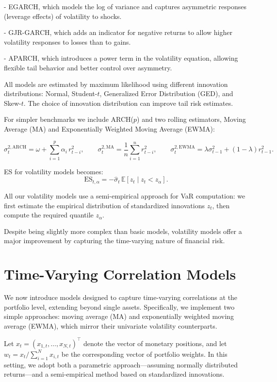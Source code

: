 \documentclass[12pt]{article}
\begin{document}
- EGARCH, which models the log of variance and captures asymmetric responses (leverage effects) of volatility to shocks.

- GJR-GARCH, which adds an indicator for negative returns to allow higher volatility responses to losses than to gains.

- APARCH, which introduces a power term in the volatility equation, allowing flexible tail behavior and better control over asymmetry.

All models are estimated by maximum likelihood using different innovation distributions: Normal, Student-\( t \), Generalized Error Distribution (GED), and Skew-\( t \). The choice of innovation distribution can improve tail risk estimates.

For simpler benchmarks we include ARCH(\( p \)) and two rolling estimators, Moving Average (MA) and Exponentially Weighted Moving Average (EWMA):

\[
\sigma_{t}^{2,\mathrm{ARCH}}=\omega+\sum_{i=1}^{p} \alpha_{i}\, r_{t-i}^{2},\qquad
\sigma_{t}^{2,\mathrm{MA}}=\frac{1}{n}\sum_{i=1}^{n} r_{t-i}^{2},\qquad
\sigma_{t}^{2,\mathrm{EWMA}}=\lambda \sigma_{t-1}^{2}+(1-\lambda) r_{t-1}^{2}.
\]

ES for volatility models becomes:
\[
  \text{ES}_{t,\alpha} = -\hat{\sigma}_t \, \mathbb{E}[z_t \mid z_t < z_\alpha].
\] 

All our volatility models use a semi-empirical approach for VaR computation: we first estimate the empirical distribution of standardized innovations \( z_t \), then compute the required quantile \( z_\alpha \).

Despite being slightly more complex than basic models, volatility models offer a major improvement by capturing the time-varying nature of financial risk.


\section{Time-Varying Correlation Models}

We now introduce models designed to capture time-varying correlations at the portfolio level, extending beyond single assets. Specifically, we implement two simple approaches: moving average (MA) and exponentially weighted moving average (EWMA), which mirror their univariate volatility counterparts.

Let \( x_t = (x_{1,t}, \dots, x_{N,t})^\top \) denote the vector of monetary positions, and let \( w_t = x_t / \sum_{i=1}^N x_{i,t} \) be the corresponding vector of portfolio weights. In this setting, we adopt both a parametric approach—assuming normally distributed returns—and a semi-empirical method based on standardized innovations.
\end{document}

